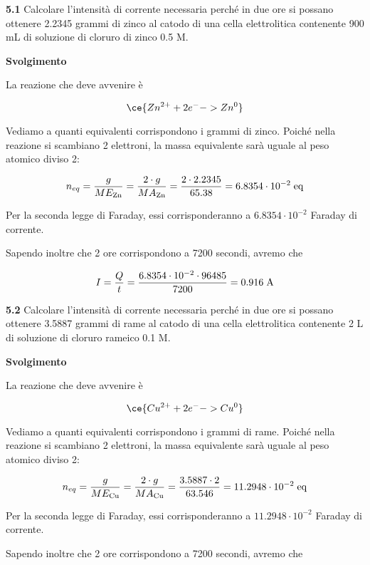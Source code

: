 \textbf{5.1} Calcolare l'intensità di corrente necessaria perché in due ore si possano ottenere 2.2345 grammi di zinco al catodo di una cella elettrolitica contenente 900 mL di soluzione di cloruro di zinco 0.5 M.

\vspace{0.2cm}\large\textbf{Svolgimento}\normalsize

\vspace{0.2cm}La reazione che deve avvenire è

$$\ce{Zn^{2+} + 2e^- -> Zn^{0}}$$

Vediamo a quanti equivalenti corrispondono i grammi di zinco. Poiché nella reazione si scambiano 2 elettroni, la massa equivalente sarà uguale al peso atomico diviso 2:

$$n_{eq}=\frac{g}{ME_{\rm Zn}}=\frac{2 \cdot g}{MA_{\rm Zn}}
=\frac{2 \cdot 2.2345}{65.38}
=6.8354 \cdot 10^{-2} \; \rm eq$$

Per la seconda legge di Faraday, essi corrisponderanno a $6.8354 \cdot 10^{-2}$ Faraday di corrente.

Sapendo inoltre che 2 ore corrispondono a 7200 secondi, avremo che

$$I=\frac{Q}{t}
=\frac{6.8354 \cdot 10^{-2} \cdot 96485}{7200}=0.916 \; \rm A$$

\vspace{0.2cm}\textbf{5.2} Calcolare l'intensità di corrente necessaria perché in due ore si possano ottenere 3.5887 grammi di rame al catodo di una cella elettrolitica contenente 2 L di soluzione di cloruro rameico 0.1 M.

\vspace{0.2cm}\large\textbf{Svolgimento}\normalsize

\vspace{0.2cm}La reazione che deve avvenire è

$$\ce{Cu^{2+} + 2e^- -> Cu^{0}}$$

Vediamo a quanti equivalenti corrispondono i grammi di rame. Poiché nella reazione si scambiano 2 elettroni, la massa equivalente sarà uguale al peso atomico diviso 2:

$$n_{eq}=\frac{g}{ME_{\rm Cu}}=\frac{2 \cdot g}{MA_{\rm Cu}}
=\frac{3.5887 \cdot 2}{63.546}
=11.2948 \cdot 10^{-2} \; \rm eq$$

Per la seconda legge di Faraday, essi corrisponderanno a $11.2948 \cdot 10^{-2}$ Faraday di corrente.

Sapendo inoltre che 2 ore corrispondono a 7200 secondi, avremo che

